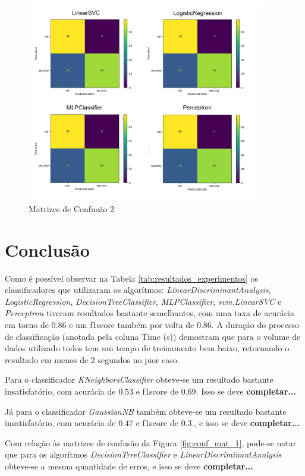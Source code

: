 \documentclass[conference]{IEEEtran}
\begin{document}
\begin{figure}[htbp]
    \centerline{\includegraphics[width=28em]{images/conf_mat_2.png}}
    \caption{Matrizes de Confusão 2}
    \label{fig:conf_mat_2}
\end{figure}

\section{Conclusão}

Como é possível observar na Tabela \ref{tab:resultados_experimentos} os classificadores que utilizaram os algorítmos: \textit{LinearDiscriminantAnalysis}, \textit{LogisticRegression}, \textit{DecisionTreeClassifier}, \textit{MLPClassifier}, \textit{svm.LinearSVC} e \textit{Perceptron} tiveram resultados bastante semelhantes, com uma taxa de acurácia em torno de $0.86$ e um f1score também por volta de $0.86$. A duração do processo de classificação (anotada pela coluna Time (s)) demostram que para o volume de dados utilizado todos tem um tempo de treinamento bem baixo, retornando o resultado em menos de 2 segundos no pior caso.

Para o classificador \textit{KNeighborsClassifier} obteve-se um resultado bastante insatisfatório, com acurácia de $0.53$ e f1score de $0.69$. Isso se deve \textbf{completar...}

Já para o classificador \textit{GaussianNB} também obteve-se um resultado bastante insatisfatório, com acurácia de $0.47$ e f1score de $0.3$., e isso se deve \textbf{completar...}

Com relação às matrizes de confusão da Figura \ref{fig:conf_mat_1}, pode-se notar que para os algorítmos \textit{DecisionTreeClassifier} e \textit{LinearDiscriminantAnalysis} obteve-se a mesma quantidade de erros, e isso se deve \textbf{completar...}
\end{document}

